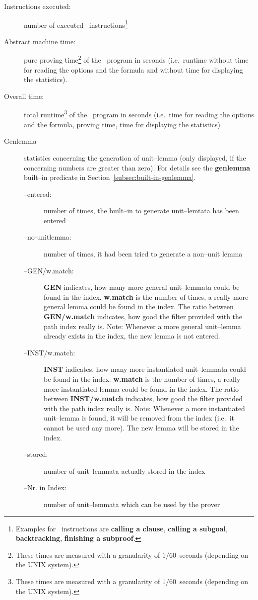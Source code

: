 \begin{description}
\item[Instructions executed:]
     number of executed \SAM\ instructions\footnote{Examples for \SAM\
     instructions are {\bf calling a clause}, {\bf calling a subgoal},
     {\bf backtracking}, {\bf finishing a subproof}.}
     
\item[Abstract machine time:]
     pure proving time\footnote{These times are measured
     with a granularity of $1/60$~seconds (depending on the UNIX
     system).} 
     of the \SAM\ program in seconds (i.e.\ runtime
     without time for reading the options and the formula and without
     time for displaying the statistics). 
     
\item[Overall time:]
     total runtime\footnote{These times are measured
     with a granularity of $1/60$~seconds (depending on the UNIX
     system).}  
     of the \SAM\ program in seconds (i.e.\ time for
     reading the options and the formula, proving time, time for
     displaying the statistics)
     
\item[Genlemma]
     statistics concerning the generation of unit--lemma (only
     displayed, if the concerning numbers are greater than zero). For
     details see the {\bf genlemma} built--in predicate in
     Section~\ref{subsec:built-in-genlemma}. 
     \begin{description}
     \item [--entered:] 
           number of times, the built--in to generate unit--lemtata has
           been entered
     \item [--no-unitlemma:]
           number of times, it had been tried to generate a non--unit
           lemma 
     \item [--GEN/w.match:] 
           {\bf GEN } indicates, how many more general unit--lemmata 
           could be found in the index. {\bf w.match} is the
           number of times, a really more general lemma could
           be found in the index. The ratio between {\bf GEN/w.match}
           indicates, how good the filter provided with the path index 
           really is. Note: Whenever a more general unit--lemma
           already exists in the index, the new lemma is not entered.
     \item [--INST/w.match:] 
           {\bf INST } indicates, how many more instantiated
           unit--lemmata could be found in the index. {\bf w.match} is
           the number of times, a really more instantiated lemma could
           be found in the index. The ratio between {\bf INST/w.match}
           indicates, how good the filter provided with the path index
           really is. Note: Whenever a more instantiated unit--lemma
           is found, it will be removed from the index (i.e.\ it
           cannot be used any more). The new lemma will be stored in the 
           index. 
     \item [--stored:] 
           number of unit--lemmata actually stored in the index
     \item [--Nr. in Index:] 
           number of unit--lemmata which can be used by the prover
     \end{description}


\end{description}

